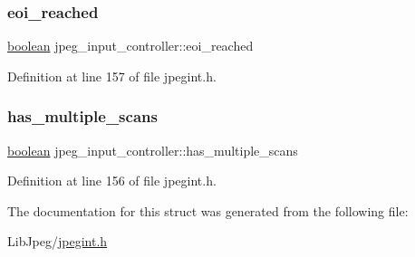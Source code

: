\subsubsection{\texorpdfstring{eoi\_reached}{eoi\_reached}}
{\footnotesize\ttfamily \mbox{\hyperlink{jmorecfg_8h_a7c6368b321bd9acd0149b030bb8275ed}{boolean}} jpeg\+\_\+input\+\_\+controller\+::eoi\+\_\+reached}



Definition at line 157 of file jpegint.\+h.

\mbox{\label{structjpeg__input__controller_a6f02f9c18464bfbf30b27f5a43c2665a}} 
\subsubsection{\texorpdfstring{has\_multiple\_scans}{has\_multiple\_scans}}
{\footnotesize\ttfamily \mbox{\hyperlink{jmorecfg_8h_a7c6368b321bd9acd0149b030bb8275ed}{boolean}} jpeg\+\_\+input\+\_\+controller\+::has\+\_\+multiple\+\_\+scans}



Definition at line 156 of file jpegint.\+h.



The documentation for this struct was generated from the following file\+:\begin{DoxyCompactItemize}
\item 
Lib\+Jpeg/\mbox{\hyperlink{jpegint_8h}{jpegint.\+h}}\end{DoxyCompactItemize}
